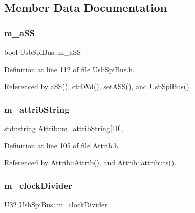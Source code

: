 \subsection{Member Data Documentation}
\mbox{\label{classUsbSpiBus_ac98d088ac8aed042f65cbd918fc538ae}} 
\subsubsection{\texorpdfstring{m\+\_\+a\+SS}{m\_aSS}}
{\footnotesize\ttfamily bool Usb\+Spi\+Bus\+::m\+\_\+a\+SS\hspace{0.3cm}{\ttfamily [private]}}



Definition at line 112 of file Usb\+Spi\+Bus.\+h.



Referenced by a\+S\+S(), ctrl\+Wd(), set\+A\+S\+S(), and Usb\+Spi\+Bus().

\mbox{\label{classAttrib_a3414521d7a82476e874b25a5407b5e63}} 
\subsubsection{\texorpdfstring{m\+\_\+attrib\+String}{m\_attribString}}
{\footnotesize\ttfamily std\+::string Attrib\+::m\+\_\+attrib\+String\mbox{[}10\mbox{]}\hspace{0.3cm}{\ttfamily [protected]}, {\ttfamily [inherited]}}



Definition at line 105 of file Attrib.\+h.



Referenced by Attrib\+::\+Attrib(), and Attrib\+::attributs().

\mbox{\label{classUsbSpiBus_a5a4de2b61018f52b885559ce07bd3161}} 
\subsubsection{\texorpdfstring{m\+\_\+clock\+Divider}{m\_clockDivider}}
{\footnotesize\ttfamily \hyperlink{classUsbSpiBus_a9b24e28662a35ca57f5ed32c41c5f3ff}{U32} Usb\+Spi\+Bus\+::m\+\_\+clock\+Divider\hspace{0.3cm}{\ttfamily [private]}}



